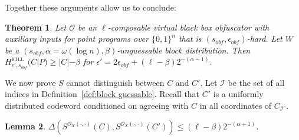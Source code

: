 \documentclass[11pt]{article}
\newcommand{\defref}[1]{\mbox{Definition~\ref{#1}}}
\newcommand{\zo}{\ensuremath{\{0, 1\}}}
\newcommand{\hill}{\ensuremath{\mathtt{HILL}}\xspace}
\newtheorem{theorem}{Theorem}[section]
\newtheorem{lemma}[theorem]{Lemma}
\begin{document}
Together these arguments allow us to conclude:
\begin{theorem}
\label{thm:security of cons}
Let $\mathcal{O}$ be an $\ell$-composable virtual black box obfuscator with auxiliary inputs for point programs over $\zo^n$ that is $(s_{obf}, \epsilon_{obf})$-hard.  Let $W$ be a $(s_{obf}, \alpha = \omega(\log n), \beta)$-unguessable block distribution.  Then $H^{\hill}_{\epsilon', s_{obf}}( C | P ) \geq |C| - \beta$ for $\epsilon' = 2\epsilon_{obf} + (\ell-\beta)2^{-(\alpha - 1)}$.
\end{theorem}

\noindent
We now prove $S$ cannot distinguish between $C$ and $C'$.  
Let $\mathcal{I}$ be the set of all indices in \defref{def:block guessable}.  Recall that $C'$ is a uniformly distributed codeword conditioned on agreeing with $C$ in all coordinates of $C_{\mathcal{I}^c}$.
\begin{lemma}
\label{lem:sim cannot distinguish}
$\Delta(S^{\mathcal{O}_X(\cdot, \cdot)}(C), S^{\mathcal{O}_X(\cdot, \cdot)}(C')) \le (\ell-\beta) 2^{-(\alpha+1)}$.
\end{lemma}
\end{document}
